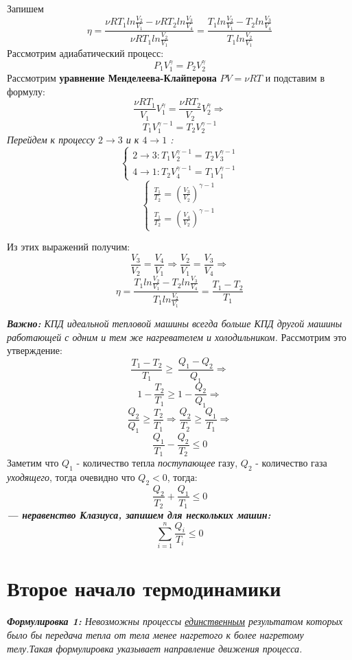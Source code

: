 \documentclass[../main.tex]{subfiles}
\begin{document}
Запишем
\[ \eta  = \frac{\nu RT_1 ln{\frac{V_2}{V_1}} - \nu RT_2 ln{\frac{V_3}{V_4}}}{\nu RT_1 ln{\frac{V_2}{V_1}}} =  \frac{T_1ln{\frac{V_2}{V_1}} - T_2ln{\frac{V_3}{V_4}}}{T_1ln{\frac{V_2}{V_1}}}\]
Рассмотрим адиабатический процесс:
\[ P_1V_1^{\gamma} = P_2V_2^{\gamma}\]
Рассмотрим \textbf{уравнение Менделеева-Клайперона }$ PV = \nu RT$ и подставим в формулу:
\[ \frac{\nu RT_1}{V_1}V_1^{\gamma} = \frac{\nu RT_2}{V_2}V_2^{\gamma} \Rightarrow \]
\[ T_1V_1^{\gamma - 1} = T_2V_2^{\gamma - 1}\]
\textit{Перейдем к процессу $2 \to 3$  и к $ 4 \to 1$ :}
\begin{equation*}
    \begin{cases}
        2 \to 3: T_1V_2^{\gamma - 1} = T_2V_3^{\gamma - 1}
        \\
        4 \to 1: T_2V_4^{\gamma - 1} = T_1V_1^{\gamma - 1}
    \end{cases}
\end{equation*}
\begin{equation*}
    \begin{cases}
        \frac{T_1}{T_2} = (\frac{V_3}{V_2}) ^ {\gamma - 1}
        \\
        \frac{T_1}{T_2} = (\frac{V_4}{V_2}) ^ {\gamma - 1}
    \end{cases}
\end{equation*}

Из этих выражений получим:
\[ \frac{V_3}{V_2} = \frac{V_4}{V_1} \Rightarrow \frac{V_2}{V_1} = \frac{V_3}{V_4} \Rightarrow\]
\[ \eta = \frac{T_1ln{\frac{V_2}{V_1}} - T_2ln{\frac{V_3}{V_4}}}{T_1ln{\frac{V_2}{V_1}}} = \frac{T_1 - T_2}{T_1}\]

\textit{\textbf{Важно: }КПД идеальной тепловой машины всегда больше КПД другой машины работающей с одним и тем же нагревателем и холодильником.} Рассмотрим это утверждение:
\[ \frac{T_1 - T_2}{T_1} \geq\ \frac{Q_1 - Q_2}{Q_1} \Rightarrow \]
\[1 - \frac{T_2}{T_1} \geq 1 - \frac{Q_2}{Q_1} \Rightarrow \]
\[ \frac{Q_2}{Q_1} \geq \frac{T_2}{T_1} \Rightarrow \frac{Q_2}{T_2} \geq \frac{Q_1}{T_1} \Rightarrow \]
\[\frac{Q_1}{T_1} - \frac{Q_2}{T_2}  \leq 0\]
Заметим что $Q_1$ - количество тепла \textit{поступающее} газу, $Q_2$ - количество газа \textit{уходящего}, тогда очевидно что $Q_2 < 0$, тогда:
\[\frac{Q_2}{T_2} + \frac{Q_1}{T_1} \leq 0\]
\textbf{\textit{ --- неравенство Клазиуса, запишем для нескольких машин:}}
\[ \sum_{i = 1}^{n} \frac{Q_i}{T_i} \leq 0\]

\section{Второе начало термодинамики}
\textit{\textbf{Формулировка 1:} Невозможны процессы \underline{единственным} результатом которых было бы передача тепла от тела менее нагретого к более нагретому телу.Такая формулировка указывает направление движения процесса.}
\end{document}
